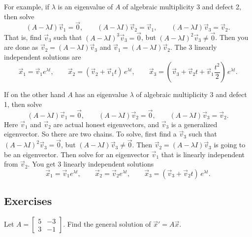 For example, if $\lambda$ is an eigenvalue of $A$
of algebraic multiplicity 3 and defect 2, then solve
\begin{equation*}
(A - \lambda I) \vec{v}_1 = \vec{0} , \qquad
(A - \lambda I) \vec{v}_2 = \vec{v}_1 , \qquad
(A - \lambda I) \vec{v}_3 = \vec{v}_2 .
\end{equation*}
That is, find $\vec{v}_3$ such that 
${(A - \lambda I)}^3 \vec{v}_3 = \vec{0}$, but
${(A - \lambda I)}^2 \vec{v}_3 \not= \vec{0}$.
Then you are done as
$\vec{v}_2 = (A - \lambda I) \vec{v}_3$
and 
$\vec{v}_1 = (A - \lambda I) \vec{v}_2$.
The 3 linearly independent solutions are
\begin{equation*}
\vec{x}_1 = \vec{v}_1 e^{\lambda t} , \qquad
\vec{x}_2 = ( \vec{v}_2 + \vec{v}_1 t ) \, e^{\lambda t} , \qquad
\vec{x}_3 = \left( \vec{v}_3 + \vec{v}_2 t +
\vec{v}_{1} \frac{t^2}{2} \right) \, e^{\lambda t} .
\end{equation*}

If on the other hand $A$ has an eigenvalue $\lambda$
of algebraic multiplicity 3 and defect 1, then 
solve
\begin{equation*}
(A - \lambda I) \vec{v}_1 = \vec{0} , \qquad
(A - \lambda I) \vec{v}_2 = \vec{0} , \qquad
(A - \lambda I) \vec{v}_3 = \vec{v}_2 .
\end{equation*}
Here $\vec{v}_1$ and $\vec{v}_2$ are actual honest eigenvectors,
and $\vec{v}_3$ is a generalized eigenvector.
So there are two chains.
To solve, first find a 
$\vec{v}_3$ such that 
${(A - \lambda I)}^2 \vec{v}_3 = \vec{0}$, but
$(A - \lambda I) \vec{v}_3 \not= \vec{0}$.
Then $\vec{v}_2 = (A - \lambda I) \vec{v}_3$ is going to be an eigenvector.
Then solve for an eigenvector $\vec{v}_1$ that is linearly independent 
from $\vec{v}_2$.
You get 3 linearly independent solutions
\begin{equation*}
\vec{x}_1 = \vec{v}_1 e^{\lambda t} , \qquad
\vec{x}_2 = \vec{v}_2 e^{\lambda t} , \qquad
\vec{x}_3 = ( \vec{v}_3 + \vec{v}_2 t ) \, e^{\lambda t} .
\end{equation*}

\subsection{Exercises}

\begin{exercise}
Let
$A = \left[ \begin{smallmatrix} 5 & -3 \\ 3 & -1 \end{smallmatrix} \right]$.
Find the general solution of ${\vec{x}}' = A \vec{x}$.
\end{exercise}

